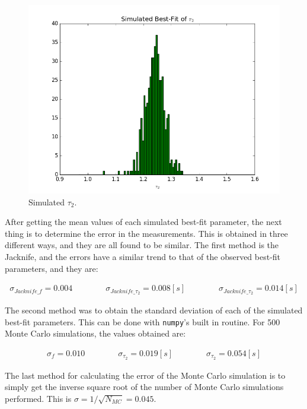 \documentclass[a4paper,12pt]{article}
\begin{document}
\begin{figure}[h]
\begin{minipage}{.32\textwidth}
  \label{fig.7}
\end{minipage}
\begin{minipage}{.32\textwidth}
  \centering
  \includegraphics[width=1.05\linewidth]{img/simulated_tau2}
  \caption{Simulated $\tau_2$.}
  \label{fig.8}
\end{minipage}
\end{figure}

After getting the mean values of each simulated best-fit parameter, the next thing is to determine the error in the measurements. This is obtained in three different ways, and they are all found to be similar. The first method is the Jacknife, and the errors have a similar trend to that of the observed best-fit parameters, and they are: 

\begin{align}
 \sigma_{Jacknife\_f} = 0.004 \qquad \qquad \sigma_{Jacknife\_\tau_2} = 0.008 [s] \qquad \qquad \sigma_{Jacknife\_\tau_2} = 0.014 [s] \nonumber
\end{align}

The second method was to obtain the standard deviation of each of the simulated best-fit parameters. This can be done with \texttt{numpy}'s built in routine. For 500 Monte Carlo simulations, the values obtained are:

\begin{align}
 \sigma_{f} = 0.010 \qquad \qquad \sigma_{\tau_2} = 0.019 [s] \qquad \qquad \sigma_{\tau_2} = 0.054 [s] \nonumber
\end{align}

The last method for calculating the error of the Monte Carlo simulation is to simply get the inverse square root of the number of Monte Carlo simulations performed. This is $\sigma = 1 / \sqrt{N_{MC}} = 0.045$. 
\end{document}
